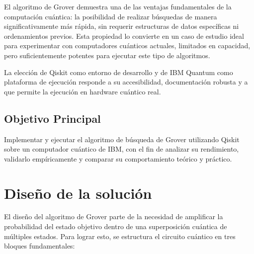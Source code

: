 \documentclass{article}
\begin{document}
El algoritmo de Grover demuestra una de las ventajas fundamentales de la computación cuántica: la posibilidad de realizar búsquedas de manera significativamente más rápida, sin requerir estructuras de datos específicas ni ordenamientos previos. Esta propiedad lo convierte en un caso de estudio ideal para experimentar con computadores cuánticos actuales, limitados en capacidad, pero suficientemente potentes para ejecutar este tipo de algoritmos.

La elección de Qiskit como entorno de desarrollo y de IBM Quantum como plataforma de ejecución responde a su accesibilidad, documentación robusta y a que permite la ejecución en hardware cuántico real.

\subsection{Objetivo Principal}

Implementar y ejecutar el algoritmo de búsqueda de Grover utilizando Qiskit sobre un computador cuántico de IBM, con el fin de analizar su rendimiento, validarlo empíricamente y comparar su comportamiento teórico y práctico.

\section{Diseño de la solución}\label{sec:dis}

El diseño del algoritmo de Grover parte de la necesidad de amplificar la probabilidad del estado objetivo dentro de una superposición cuántica de múltiples estados. Para lograr esto, se estructura el circuito cuántico en tres bloques fundamentales:
\end{document}
